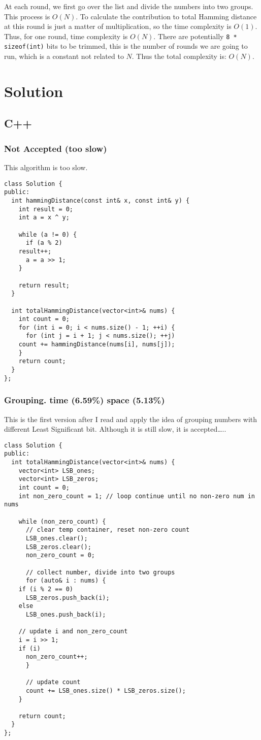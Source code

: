 \documentclass[12pt]{book}
\begin{document}
At each round, we first go over the list and divide the numbers into two groups. This process is \(O(N)\). To calculate the contribution to total Hamming distance at this round is just a matter of multiplication, so the time complexity is \(O(1)\). Thus, for one round, time complexity is \(O(N)\). There are potentially \texttt{8 * sizeof(int)} bits to be trimmed, this is the number of rounds we are going to run, which is a constant not related to \(N\). Thus the total complexity is: \(O(N)\).
\section{Solution}
\label{sec:org3325e26}
\subsection{C++}
\label{sec:orgbae8546}
\subsubsection{Not Accepted (too slow)}
\label{sec:org25a47cc}
This algorithm is too slow.
\begin{verbatim}
class Solution {
public:
  int hammingDistance(const int& x, const int& y) {
    int result = 0;
    int a = x ^ y;

    while (a != 0) {
      if (a % 2)
	result++;
      a = a >> 1;
    }

    return result;
  }  

  int totalHammingDistance(vector<int>& nums) {
    int count = 0;
    for (int i = 0; i < nums.size() - 1; ++i) {
      for (int j = i + 1; j < nums.size(); ++j)
	count += hammingDistance(nums[i], nums[j]);
    }
    return count;
  }
};
\end{verbatim}
\subsubsection{Grouping. time (6.59\%) space (5.13\%)}
\label{sec:org27a93a9}
This is the first version after I read and apply the idea of grouping numbers with different Least Significant bit. Although it is still slow, it is accepted\ldots{}..
\begin{verbatim}
class Solution {
public:
  int totalHammingDistance(vector<int>& nums) {
    vector<int> LSB_ones;
    vector<int> LSB_zeros;
    int count = 0;
    int non_zero_count = 1; // loop continue until no non-zero num in nums

    while (non_zero_count) {
      // clear temp container, reset non-zero count
      LSB_ones.clear();
      LSB_zeros.clear();
      non_zero_count = 0;

      // collect number, divide into two groups
      for (auto& i : nums) {
	if (i % 2 == 0)
	  LSB_zeros.push_back(i);
	else 
	  LSB_ones.push_back(i);

	// update i and non_zero_count
	i = i >> 1;
	if (i)
	  non_zero_count++;
      }

      // update count 
      count += LSB_ones.size() * LSB_zeros.size();
    }

    return count;
  }
};
\end{verbatim}
\end{document}
